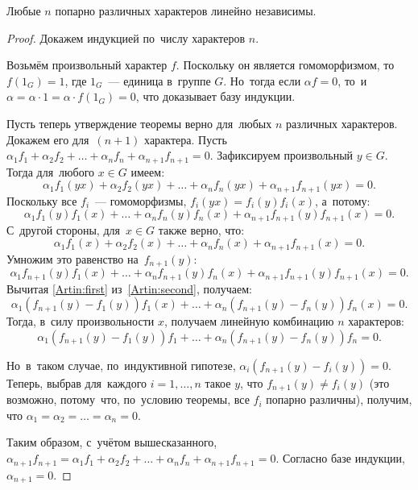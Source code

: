 \documentclass[a4paper,oneside]{article}
\newcommand{\notewrap}[1]{(#1)}
\begin{document}
\begin{theorem*}[\notewrap{Артин}]
  Любые $n$ попарно различных характеров линейно независимы.
\end{theorem*}

\begin{proof}

Докажем индукцией по~числу характеров $n$.

Возьмём произвольный характер $f$. Поскольку он является гомоморфизмом,
то~$f(1_G) = 1$, где $1_G$~— единица в~группе $G$. Но~тогда если $\alpha f = 0$,
то~и~$\alpha = \alpha \cdot 1 = \alpha \cdot f(1_G) = 0$, что доказывает базу индукции.

Пусть теперь утверждение теоремы верно для~любых $n$ различных характеров. Докажем его для~$(n + 1)$ характера.
Пусть $\alpha_1 f_1 + \alpha_2 f_2 + \ldots + \alpha_n f_n + \alpha_{n + 1} f_{n + 1} = 0$.
Зафиксируем произвольный $y \in G$. Тогда для~любого $x \in G$ имеем:
\begin{equation}\label{Artin:first}
  \alpha_1 f_1(yx) + \alpha_2 f_2(yx) + \ldots + \alpha_n f_n(yx) + \alpha_{n + 1} f_{n + 1}(yx) = 0.
\end{equation}
Поскольку все $f_i$~— гомоморфизмы, $f_i(yx) = f_i(y) f_i(x)$, а~потому:
\[
  \alpha_1 f_1(y) f_1(x) + \ldots + \alpha_n f_n(y) f_n(x) + \alpha_{n + 1} f_{n + 1}(y) f_{n + 1}(x) = 0.
\]
С~другой стороны, для~$x \in G$ также верно, что:
\[
  \alpha_1 f_1(x) + \alpha_2 f_2(x) + \ldots + \alpha_n f_n(x) + \alpha_{n + 1} f_{n + 1}(x) = 0.
\]
Умножим это равенство на~$f_{n + 1}(y)$:
\begin{equation}\label{Artin:second}
  \alpha_1 f_{n + 1}(y) f_1(x) + \ldots + \alpha_n f_{n + 1}(y) f_n(x) + \alpha_{n + 1} f_{n + 1}(y) f_{n + 1}(x) = 0.
\end{equation}
Вычитая \eqref{Artin:first} из~\eqref{Artin:second}, получаем:
\[
  \alpha_1 (f_{n + 1}(y) - f_1(y)) f_1(x) + \ldots + \alpha_n (f_{n + 1}(y) - f_n(y)) f_n(x) = 0.
\]
Тогда, в~силу произвольности $x$, получаем линейную комбинацию $n$ характеров:
\[
  \alpha_1 (f_{n + 1}(y) - f_1(y)) f_1 + \ldots + \alpha_n (f_{n + 1}(y) - f_n(y)) f_n = 0.
\]

Но~в~таком случае, по~индуктивной гипотезе, $\alpha_i (f_{n + 1}(y) - f_i(y)) = 0$.
Теперь, выбрав для~каждого $i = 1, \ldots, n$ такое $y$, что $f_{n + 1}(y) \neq f_i(y)$
(это возможно, потому~что, по~условию теоремы, все $f_i$ попарно различны), получим,
что $\alpha_1 = \alpha_2 = \ldots = \alpha_n = 0$.

Таким образом, с~учётом вышесказанного, $\alpha_{n + 1} f_{n + 1} = \alpha_1 f_1 + \alpha_2 f_2 + \ldots + \alpha_n f_n + \alpha_{n + 1} f_{n + 1} = 0$.
Согласно базе индукции, $\alpha_{n + 1} = 0$.
\end{proof}
\end{document}
